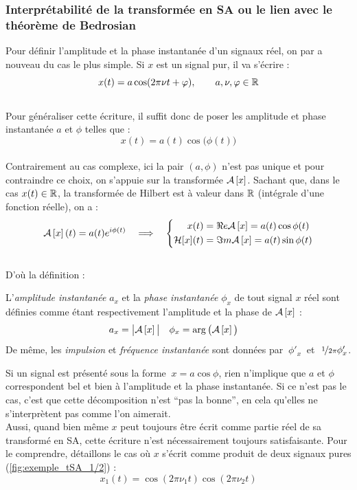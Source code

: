 \begin{annexe}
\subsubsection{\wip Interprétabilité de la transformée en SA ou le lien avec le théorème de Bedrosian}\label{ann:bedrosian}

Pour définir l'amplitude et la phase instantanée d'un signaux réel, on par a nouveau du cas le plus simple. Si $x$ est un signal pur, il va s'écrire :
\[x(t) = a \cos(2\pi\nu t + \varphi),\qquad a,\nu,\varphi\in\mathbb{R}\]
\\
Pour généraliser cette écriture, il suffit donc de poser les amplitude et phase instantanée $a$ et $\phi$ telles que :
\[x(t) = a(t) \cos\big( \phi(t) \big)\]
\\
Contrairement au cas complexe, ici la pair $(a,\phi)$ n'est pas unique et pour contraindre ce choix, on s'appuie sur la transformée $\mathcal{A}\left[x\right]$. Sachant que, dans le cas $x(t)\in\mathbb{R}$, la transformée de Hilbert est à valeur dans $\mathbb{R}$ (intégrale d'une fonction réelle), on a :
\[\mathcal{A}\left[x\right](t) = a(t)e^{i\phi(t)}\quad \Longrightarrow\quad \left\{\begin{aligned}x(t) &= \Re e \mathcal{A}\left[x\right] = a(t) \cos\phi(t) \\ \mathcal{H}[x](t) &= \Im m \mathcal{A}\left[x\right] = a(t) \sin\phi(t)
\end{aligned}\right.\]
\\
D'où la définition :
\begin{definition}\label{def:ampli-phase_instant}
	L'\emph{amplitude instantanée} $a_x$ et la \emph{phase instantanée} $\phi_x$ de tout signal $x$ réel sont définies comme étant respectivement l'amplitude et la phase de $\mathcal{A}\left[x\right]$ :
	\begin{align}\label{eq:ampli-phase_instant}
		a_x &= \big|\mathcal{A}\left[x\right]\big|   &   \phi_x &= \arg\big(\mathcal{A}\left[x\right]\big)
	\end{align}
	De même, les \emph{impulsion} et \emph{fréquence instantanée} sont données par $\ \phi'_x\ $ et $\ \nicefrac{1}{2\pi}\phi_x'$.
\end{definition}
\skipl

Si un signal est présenté sous la forme  $\ x=a\cos\phi$, rien n'implique que $a$ et $\phi$ correspondent bel et bien à l'amplitude et la phase instantanée. Si ce n'est pas le cas, c'est que cette décomposition n'est ``pas la bonne'', en cela qu'elles ne s’interprètent pas comme l'on aimerait.
\\
Aussi, quand bien même $x$ peut toujours être écrit comme partie réel de sa transformé en SA, cette écriture n'est nécessairement toujours satisfaisante. Pour le comprendre, détaillons le cas où $x$ s'écrit comme produit de deux signaux pures (\cref{fig:exemple_tSA_1/2}) :
\[x_1(t) = \cos (2\pi\nu_1t)\cos (2\pi\nu_2t)\]


\end{annexe}
